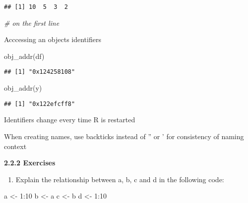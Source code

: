 \documentclass[
]{article}
\newenvironment{Shaded}{\begin{snugshade}}{\end{snugshade}}
\newcommand{\CommentTok}[1]{\textcolor[rgb]{0.56,0.35,0.01}{\textit{#1}}}
\newcommand{\DecValTok}[1]{\textcolor[rgb]{0.00,0.00,0.81}{#1}}
\newcommand{\FunctionTok}[1]{\textcolor[rgb]{0.00,0.00,0.00}{#1}}
\newcommand{\NormalTok}[1]{#1}
\newcommand{\OtherTok}[1]{\textcolor[rgb]{0.56,0.35,0.01}{#1}}
\newcommand{\SpecialCharTok}[1]{\textcolor[rgb]{0.00,0.00,0.00}{#1}}
\providecommand{\tightlist}{%
  \setlength{\itemsep}{0pt}\setlength{\parskip}{0pt}}
\begin{document}
\begin{verbatim}
## [1] 10  5  3  2
\end{verbatim}

\begin{Shaded}
\begin{Highlighting}[]
\CommentTok{\# on the first line}
\end{Highlighting}
\end{Shaded}

Acccessing an objects identifiers

\begin{Shaded}
\begin{Highlighting}[]
\FunctionTok{obj\_addr}\NormalTok{(df)}
\end{Highlighting}
\end{Shaded}

\begin{verbatim}
## [1] "0x124258108"
\end{verbatim}

\begin{Shaded}
\begin{Highlighting}[]
\FunctionTok{obj\_addr}\NormalTok{(y)}
\end{Highlighting}
\end{Shaded}

\begin{verbatim}
## [1] "0x122efcff8"
\end{verbatim}

Identifiers change every time R is restarted

When creating names, use backticks instead of '' or ' for consistency of
naming context

\textbf{2.2.2 Exercises}

\begin{enumerate}
\def\labelenumi{\arabic{enumi}.}
\tightlist
\item
  Explain the relationship between a, b, c and d in the following code:
\end{enumerate}

\begin{Shaded}
\begin{Highlighting}[]
\NormalTok{a }\OtherTok{\textless{}{-}} \DecValTok{1}\SpecialCharTok{:}\DecValTok{10}
\NormalTok{b }\OtherTok{\textless{}{-}}\NormalTok{ a}
\NormalTok{c }\OtherTok{\textless{}{-}}\NormalTok{ b}
\NormalTok{d }\OtherTok{\textless{}{-}} \DecValTok{1}\SpecialCharTok{:}\DecValTok{10}
\end{Highlighting}
\end{Shaded}
\end{document}
